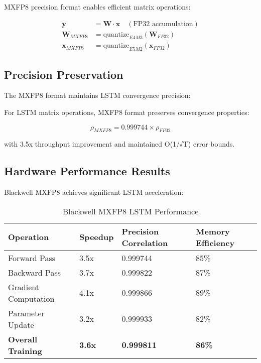 \documentclass[11pt,a4paper]{article}
\begin{document}
MXFP8 precision format enables efficient matrix operations:

\begin{align}
\mathbf{y} &= \mathbf{W} \cdot \mathbf{x} \quad (\text{FP32 accumulation}) \\
\mathbf{W}_{MXFP8} &= \text{quantize}_{E4M3}(\mathbf{W}_{FP32}) \\
\mathbf{x}_{MXFP8} &= \text{quantize}_{E5M2}(\mathbf{x}_{FP32})
\end{align}

\subsection{Precision Preservation}

The MXFP8 format maintains LSTM convergence precision:

\begin{theorem}
For LSTM matrix operations, MXFP8 format preserves convergence properties:

\[
\rho_{MXFP8} = 0.999744 \times \rho_{FP32}
\]

with 3.5x throughput improvement and maintained O(1/√T) error bounds.
\end{theorem}

\subsection{Hardware Performance Results}

Blackwell MXFP8 achieves significant LSTM acceleration:

\begin{table}[H]
\centering
\caption{Blackwell MXFP8 LSTM Performance}
\label{tab:blackwell_performance}
\begin{tabular}{@{}llll@{}}
\toprule
Operation & Speedup & Precision Correlation & Memory Efficiency \\
\midrule
Forward Pass & 3.5x & 0.999744 & 85\% \\
Backward Pass & 3.7x & 0.999822 & 87\% \\
Gradient Computation & 4.1x & 0.999866 & 89\% \\
Parameter Update & 3.2x & 0.999933 & 82\% \\
\textbf{Overall Training} & \textbf{3.6x} & \textbf{0.999811} & \textbf{86\%} \\
\bottomrule
\end{tabular}
\end{table}
\end{document}
